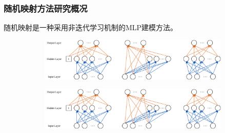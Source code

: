     \begin{frame}
        \frametitle{随机映射方法研究概况}
        随机映射是一种采用非迭代学习机制的MLP建模方法。
    
        \begin{figure}[H]
            \begin{subfigure}[b]{0.25\textwidth}
                \includegraphics[height=\linewidth]{float/ch.cnn/layer.pdf}
                \caption*{}
            \end{subfigure}
            \hspace*{-0.15\textwidth}
            \begin{subfigure}[b]{0.25\textwidth}
                \includegraphics[height=\linewidth]{float/ch.cnn/schmidt.pdf}

\end{subfigure}
\end{figure}
\end{frame}
